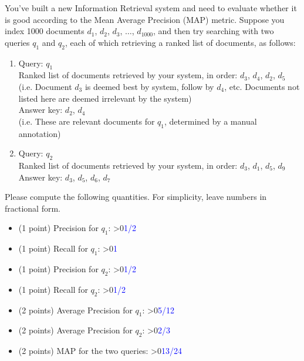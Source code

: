 \documentclass[12pt]{article}
\newcounter{showsolution}
\newcommand{\solution}[2]{\ifnum\value{showsolution}>0{\textcolor{blue}{#1}}\else{#2}\fi}
\begin{document}
You've built a new Information Retrieval system and need to evaluate whether it is good according to the Mean Average Precision (MAP) metric. Suppose you index 1000 documents $d_1$, $d_2$, $d_3$, $\ldots$, $d_{1000}$, and then try searching with two queries $q_1$ and $q_2$, each of which retrieving a ranked list of documents, as follows: 

\begin{enumerate}
\item Query: $q_1$\\[2mm]
Ranked list of documents retrieved by your system, in order: $d_3$, $d_4$, $d_2$, $d_5$\\ (i.e. Document $d_3$ is deemed best by system, follow by $d_4$, etc. Documents not listed here are deemed irrelevant by the system)\\[2mm]
Answer key: $d_2$, $d_4$ \\(i.e. These are relevant documents for $q_1$, determined by a manual annotation)
\item Query: $q_2$\\[2mm]
Ranked list of documents retrieved by your system, in order: $d_3$, $d_1$, $d_5$, $d_9$\\[2mm]
Answer key: $d_3$, $d_5$, $d_6$, $d_7$ 
\end{enumerate}

Please compute the following quantities. For simplicity, leave numbers in fractional form. 
\begin{itemize}
    \item (1 point) Precision for $q_1$: \solution{1/2}{}
    \item (1 point) Recall for $q_1$:  \solution{1}{}
    \item (1 point) Precision for $q_2$: \solution{1/2}{}
    \item (1 point) Recall for $q_2$: \solution{1/2}{}
    \item (2 points) Average Precision for $q_1$: \solution{5/12}{}
    \item (2 points) Average Precision for $q_2$: \solution{2/3}{}
    \item (2 points) MAP for the two queries: \solution{13/24}{}
\end{itemize}

\end{document}
